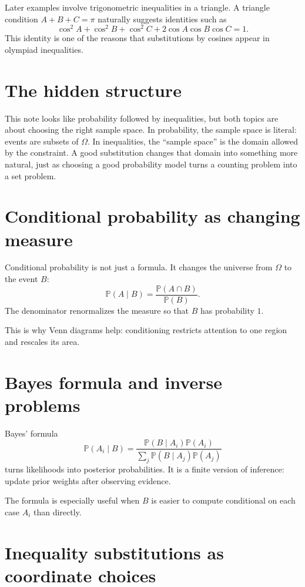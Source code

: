 Later examples involve trigonometric inequalities in a triangle.  A triangle condition \(A+B+C=\pi\) naturally suggests identities such as
\[
  \cos^2A+\cos^2B+\cos^2C+2\cos A\cos B\cos C=1.
\]
This identity is one of the reasons that substitutions by cosines appear in olympiad inequalities.

\section{The hidden structure}

This note looks like probability followed by inequalities, but both topics are about choosing the right sample space.  In probability, the sample space is literal: events are subsets of \(\Omega\).  In inequalities, the ``sample space'' is the domain allowed by the constraint.  A good substitution changes that domain into something more natural, just as choosing a good probability model turns a counting problem into a set problem.

\section{Conditional probability as changing measure}

Conditional probability is not just a formula.  It changes the universe from \(\Omega\) to the event \(B\):
\[
  \mathbb P(A\mid B)=\frac{\mathbb P(A\cap B)}{\mathbb P(B)}.
\]
The denominator renormalizes the measure so that \(B\) has probability \(1\).

This is why Venn diagrams help: conditioning restricts attention to one region and rescales its area.

\section{Bayes formula and inverse problems}

Bayes' formula
\[
  \mathbb P(A_i\mid B)=\frac{\mathbb P(B\mid A_i)\mathbb P(A_i)}{\sum_j \mathbb P(B\mid A_j)\mathbb P(A_j)}
\]
turns likelihoods into posterior probabilities.  It is a finite version of inference: update prior weights after observing evidence.

The formula is especially useful when \(B\) is easier to compute conditional on each case \(A_i\) than directly.

\section{Inequality substitutions as coordinate choices}


